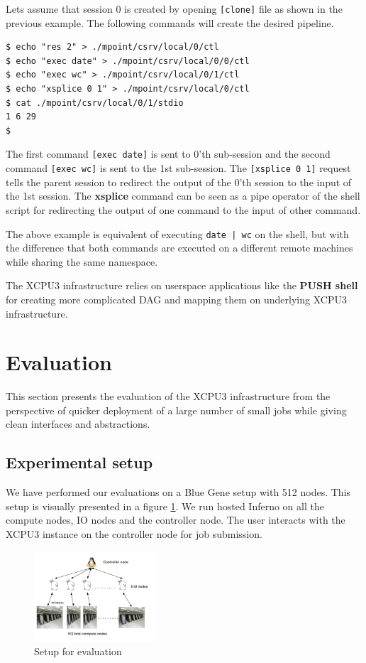 \documentclass{sig-alternate}
\begin{document}
Lets assume that session 0 is created by opening \texttt{[clone]} file as shown
in the previous example.  The following commands will create the desired
pipeline.

\begin{verbatim}
$ echo "res 2" > ./mpoint/csrv/local/0/ctl
$ echo "exec date" > ./mpoint/csrv/local/0/0/ctl
$ echo "exec wc" > ./mpoint/csrv/local/0/1/ctl
$ echo "xsplice 0 1" > ./mpoint/csrv/local/0/ctl
$ cat ./mpoint/csrv/local/0/1/stdio
1 6 29
$
\end{verbatim}

The first command \texttt{[exec date]} is sent to 0'th sub-session and the
second command \texttt{[exec wc]} is sent to the 1st sub-session.  The
\texttt{[xsplice 0 1]} request tells the parent session to redirect the output
of the 0'th session to the input of the 1st session.  The \textbf{xsplice}
command can be seen as a pipe operator of the shell script for redirecting the
output of one command to the input of other command.

The above example is equivalent of executing \texttt{date | wc} on the shell,
but with the difference that both commands are executed on a different remote
machines while sharing the same namespace.

The XCPU3 infrastructure relies on userspace applications like the \textbf{PUSH
shell}\cite{PODC:Push} for creating more complicated DAG and mapping them on
underlying XCPU3 infrastructure.

\section{Evaluation}

This section presents the evaluation of the XCPU3 infrastructure from the
perspective of quicker deployment of a large number of small jobs while giving
clean interfaces and abstractions.


\subsection{Experimental setup}
We have performed our evaluations on a Blue Gene setup with 512 nodes.  This
setup is visually presented in a figure \ref{fig:hare}.  We run hosted Inferno
on all the compute nodes, IO nodes and the controller node.  The user interacts 
with the XCPU3 instance on the controller node for job submission.


\begin{figure}[h]
  \begin{center}
    \leavevmode
      \includegraphics[height=0.2\textheight,width=0.4\textwidth]
		{./img/EvaluationSetup}
    \caption{Setup for evaluation}
    \label{fig:hare}
  \end{center}
\end{figure}
\end{document}
